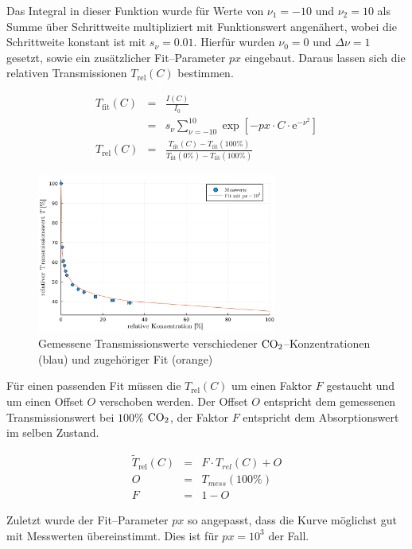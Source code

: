 \documentclass[12pt,a4paper]{scrartcl}
\numberwithin{equation}{section} %
\begin{document}
Das Integral in dieser Funktion wurde für Werte von $\nu_1 = -10$ und $\nu_2 = 10$ als Summe über Schrittweite multipliziert mit Funktionswert angenähert, wobei die Schrittweite konstant ist mit $s_\nu = 0.01$. Hierfür wurden $\nu_0 = 0$ und $\Delta \nu = 1$ gesetzt, sowie ein zusätzlicher Fit--Parameter $px$ eingebaut. Daraus lassen sich die relativen Transmissionen $T_\mathrm{rel}(C)$ bestimmen.

\begin{eqnarray}
	T_\mathrm{fit}(C) &=& \frac{I(C)}{I_0} \\
		&=& s_\nu \sum_{\nu = -10}^{10} \exp[- px \cdot C \cdot \mathrm e^{-\nu^2}] \\
	T_\mathrm{rel}(C)
		&=& \frac{
				T_\mathrm{fit}(C) - T_\mathrm{fit}(100\%)
			}{
				T_\mathrm{fit}(0\%) - T_\mathrm{fit}(100\%)
			}
\end{eqnarray}

\begin{figure}[h]
	\centering
	\includegraphics[width=0.7\textwidth]{../media/B1.1/tkFit.pdf}
	\caption{Gemessene Transmissionswerte verschiedener $\ce{CO_2}$--Konzentrationen (blau) und zugehöriger Fit (orange)}
	\label{abb:tkFit}
\end{figure}


\noindent
Für einen passenden Fit müssen die $T_\mathrm{rel}(C)$ um einen Faktor $F$ gestaucht und um einen Offset $O$ verschoben werden. Der Offset $O$ entspricht dem gemessenen Transmissionswert bei $100\%$ $\ce{CO_2}$, der Faktor $F$ entspricht dem Absorptionswert im selben Zustand.

\begin{eqnarray}
	\tilde{T}_\mathrm{rel}(C) &=& F \cdot T_{rel}(C) + O \\
	O &=& T_{mess}(100\%) \\
	F &=& 1 - O
\end{eqnarray}

\noindent
Zuletzt wurde der Fit--Parameter $px$ so angepasst, dass die Kurve möglichst gut mit Messwerten übereinstimmt. Dies ist für $px = 10^3$ der Fall.
\end{document}
